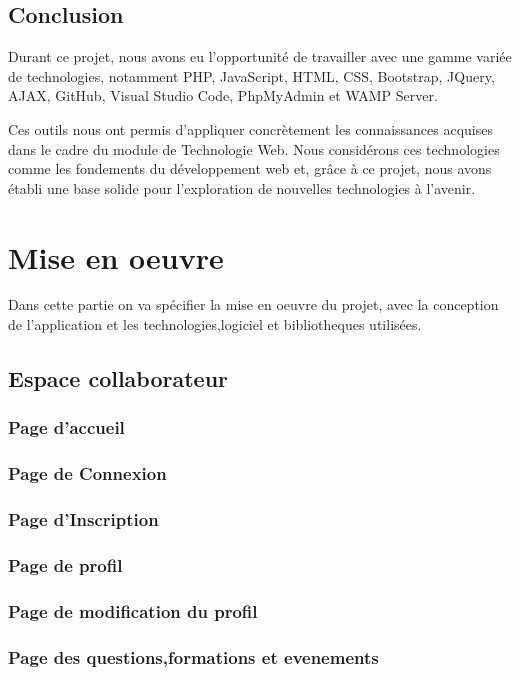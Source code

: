 \documentclass{article}
\begin{document}
        \subsection{Conclusion}
            Durant ce projet, nous avons eu l'opportunité de travailler avec une gamme variée de technologies, notamment PHP, JavaScript, HTML, CSS, Bootstrap, JQuery, AJAX, GitHub, Visual Studio Code, PhpMyAdmin et WAMP Server. 

            Ces outils nous ont permis d'appliquer concrètement les connaissances acquises dans le cadre du module de Technologie Web. Nous considérons ces technologies comme les fondements du développement web et, grâce à ce projet, nous avons établi une base solide pour l'exploration de nouvelles technologies à l'avenir.
    
    \section{Mise en oeuvre}
        Dans cette partie on va spécifier la mise en oeuvre du projet, avec la conception de l'application et les technologies,logiciel et bibliotheques utilisées. 

        \subsection{Espace collaborateur}
            \subsubsection{Page d'accueil}
            \subsubsection{Page de Connexion}
            \subsubsection{Page d'Inscription}
            \subsubsection{Page de profil}
            \subsubsection{Page de modification du profil}
            \subsubsection{Page des questions,formations et evenements}
\end{document}
